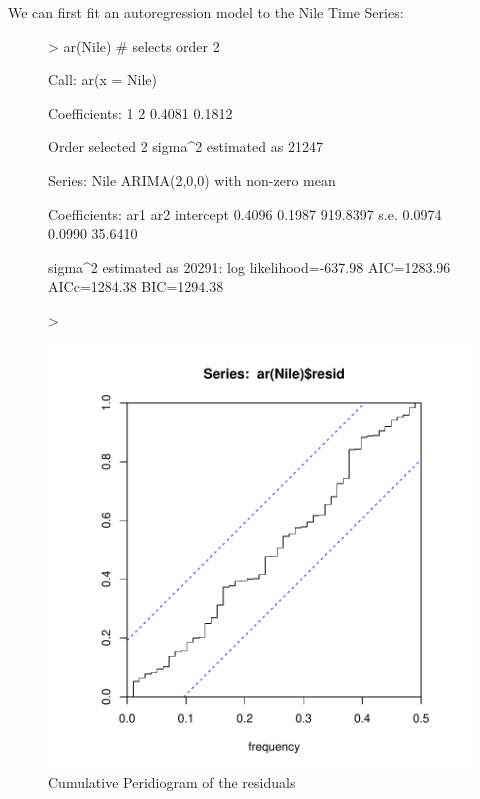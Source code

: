 \documentclass[11pt, a4paper]{article} %
\begin{document}
\noindent We can first fit an autoregression model to the Nile Time Series:
\begin{figure}
\centering
\begin{Schunk}
\begin{Sinput}
> ar(Nile) # selects order 2
\end{Sinput}
\begin{Soutput}
Call:
ar(x = Nile)

Coefficients:
     1       2  
0.4081  0.1812  

Order selected 2  sigma^2 estimated as  21247
\end{Soutput}
\begin{Soutput}
Series: Nile 
ARIMA(2,0,0) with non-zero mean 

Coefficients:
         ar1     ar2  intercept
      0.4096  0.1987   919.8397
s.e.  0.0974  0.0990    35.6410

sigma^2 estimated as 20291:  log likelihood=-637.98
AIC=1283.96   AICc=1284.38   BIC=1294.38
\end{Soutput}
\begin{Sinput}
> 
\end{Sinput}
\end{Schunk}
\includegraphics{alles-036}
\caption{Cumulative Peridiogram of the residuals}
\end{figure}
\end{document}

